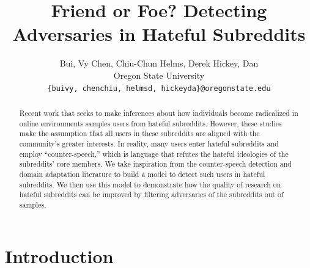 \documentclass[10pt,twocolumn,letterpaper]{article}
\begin{document}
\title{Friend or Foe? Detecting Adversaries in Hateful Subreddits}

\author{Bui, Vy \hspace{20pt} Chen, Chiu-Chun \hspace{20 pt} Helms, Derek \hspace{20 pt} Hickey, Dan \\
Oregon State University\\
{\tt\small \{buivy, chenchiu, helmsd, hickeyda\}@oregonstate.edu}
}
\maketitle

\begin{abstract}
   Recent work that seeks to make inferences about how individuals become radicalized in online environments samples users from hateful subreddits. However, these studies make the assumption that all users in these subreddits are aligned with the community's greater interests. In reality, many users enter hateful subreddits and employ ``counter-speech,'' which is language that refutes the hateful ideologies of the subreddits' core members. We take inspiration from the counter-speech detection and domain adaptation literature to build a model to detect such users in hateful subreddits. We then use this model to demonstrate how the quality of research on hateful subreddits can be improved by filtering adversaries of the subreddits out of samples.
\end{abstract}

\section{Introduction}
\end{document}
